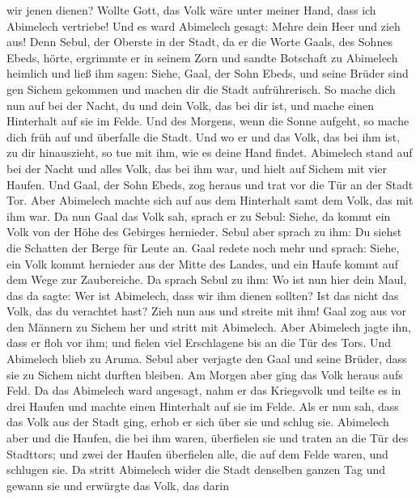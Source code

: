 wir jenen dienen?  Wollte Gott, das Volk wäre unter meiner
Hand, dass ich Abimelech vertriebe! Und es ward Abimelech gesagt: Mehre
dein Heer und zieh aus!  Denn Sebul, der Oberste in der
Stadt, da er die Worte Gaals, des Sohnes Ebeds, hörte, ergrimmte er in
seinem Zorn  und sandte Botschaft zu Abimelech heimlich und
ließ ihm sagen: Siehe, Gaal, der Sohn Ebeds, und seine Brüder sind gen
Sichem gekommen und machen dir die Stadt aufrührerisch.  So
mache dich nun auf bei der Nacht, du und dein Volk, das bei dir ist, und
mache einen Hinterhalt auf sie im Felde.  Und des Morgens,
wenn die Sonne aufgeht, so mache dich früh auf und überfalle die Stadt.
Und wo er und das Volk, das bei ihm ist, zu dir hinauszieht, so tue mit
ihm, wie es deine Hand findet.  Abimelech stand auf bei der
Nacht und alles Volk, das bei ihm war, und hielt auf Sichem mit vier
Haufen.  Und Gaal, der Sohn Ebeds, zog heraus und trat vor
die Tür an der Stadt Tor. Aber Abimelech machte sich auf aus dem
Hinterhalt samt dem Volk, das mit ihm war.  Da nun Gaal das
Volk sah, sprach er zu Sebul: Siehe, da kommt ein Volk von der Höhe des
Gebirges hernieder. Sebul aber sprach zu ihm: Du siehst die Schatten der
Berge für Leute an.  Gaal redete noch mehr und sprach:
Siehe, ein Volk kommt hernieder aus der Mitte des Landes, und ein Haufe
kommt auf dem Wege zur Zaubereiche.  Da sprach Sebul zu
ihm: Wo ist nun hier dein Maul, das da sagte: Wer ist Abimelech, dass
wir ihm dienen sollten? Ist das nicht das Volk, das du verachtet hast?
Zieh nun aus und streite mit ihm!  Gaal zog aus vor den
Männern zu Sichem her und stritt mit Abimelech.  Aber
Abimelech jagte ihn, dass er floh vor ihm; und fielen viel Erschlagene
bis an die Tür des Tors.  Und Abimelech blieb zu Aruma.
Sebul aber verjagte den Gaal und seine Brüder, dass sie zu Sichem nicht
durften bleiben.  Am Morgen aber ging das Volk heraus aufs
Feld. Da das Abimelech ward angesagt,  nahm er das
Kriegsvolk und teilte es in drei Haufen und machte einen Hinterhalt auf
sie im Felde. Als er nun sah, dass das Volk aus der Stadt ging, erhob er
sich über sie und schlug sie.  Abimelech aber und die
Haufen, die bei ihm waren, überfielen sie und traten an die Tür des
Stadttors; und zwei der Haufen überfielen alle, die auf dem Felde waren,
und schlugen sie.  Da stritt Abimelech wider die Stadt
denselben ganzen Tag und gewann sie und erwürgte das Volk, das darin
